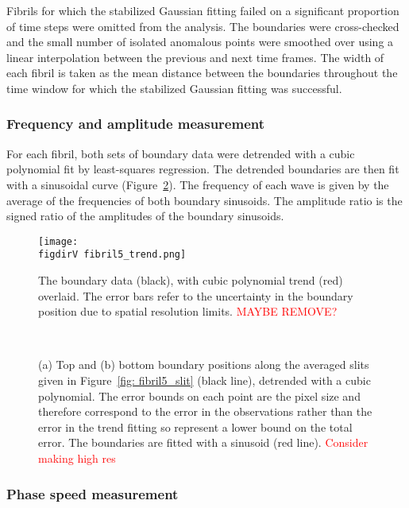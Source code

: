 Fibrils for which the stabilized Gaussian fitting failed on a significant proportion of time steps were omitted from the analysis. The boundaries were cross-checked and the small number of isolated anomalous points were smoothed over using a linear interpolation between the previous and next time frames. The width of each fibril is taken as the mean distance between the boundaries throughout the time window for which the stabilized Gaussian fitting was successful.


\subsubsection{Frequency and amplitude measurement} \label{sec:freq amp}
For each fibril, both sets of boundary data were detrended with a cubic polynomial fit by least-squares regression. The detrended boundaries are then fit with a sinusoidal curve (Figure~\ref{fig: fibril5_detrend}). The frequency of each wave is given by the average of the frequencies of both boundary sinusoids. The amplitude ratio is the signed ratio of the amplitudes of the boundary sinusoids.

\begin{figure}
\centering
\texttt{[image: \\figdirV fibril5\_trend.png]}
\caption{The boundary data (black), with cubic polynomial trend (red) overlaid. The error bars refer to the uncertainty in the boundary position due to spatial resolution limits. \textcolor{red}{MAYBE REMOVE?}}
\label{fig: fibril5_trend}
\end{figure}

\begin{figure}
	\centering
	 \\
	\caption{(a) Top and (b) bottom boundary positions along the averaged slits given in Figure~\ref{fig: fibril5_slit} (black line), detrended with a cubic polynomial. The error bounds on each point are the pixel size and therefore correspond to the error in the observations rather than the error in the trend fitting so represent a lower bound on the total error. The boundaries are fitted with a sinusoid (red line). \textcolor{red}{Consider making high res}}
	\label{fig: fibril5_detrend}
\end{figure}


\subsubsection{Phase speed measurement} \label{sec:phase speed}

